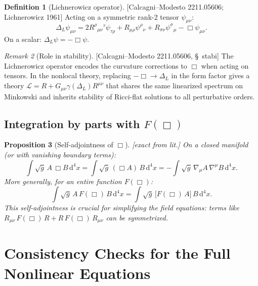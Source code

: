 \documentclass[12pt,a4paper]{article}
\newtheorem{proposition}{Proposition}[section]
\theoremstyle{definition}
\newtheorem{definition}[proposition]{Definition}
\theoremstyle{remark}
\newtheorem{remark}[proposition]{Remark}
\newcommand{\dd}{\mathrm{d}}
\newcommand{\fromlit}[1]{\textcolor{blue!70!black}{\textsf{[#1]}}}
\newcommand{\exactlit}{\textcolor{blue!60!black}{\textsf{[exact from lit.]}}}
\begin{document}
\begin{definition}[Lichnerowicz operator]
\label{def:lichnerowicz}
\fromlit{Calcagni--Modesto 2211.05606; Lichnerowicz 1961}
Acting on a symmetric rank-2 tensor $\psi_{\mu\nu}$:
\begin{equation}\label{eq:lichnerowicz}
  \Delta_L\psi_{\mu\nu}
  = 2R^\rho{}_{\mu\nu}{}^\tau\psi_{\tau\rho}
    + R_{\mu\rho}\psi^\rho{}_\nu
    + R_{\sigma\nu}\psi^\sigma{}_\mu
    - \Box\psi_{\mu\nu}.
\end{equation}
On a scalar: $\Delta_L\psi = -\Box\psi$.
\end{definition}

\begin{remark}[Role in stability]
\fromlit{Calcagni--Modesto 2211.05606, \S~stabi}
The Lichnerowicz operator encodes the curvature corrections to $\Box$
when acting on tensors.  In the nonlocal theory, replacing
$-\Box \to \Delta_L$ in the form factor gives a theory
$\mathcal{L} = R + G_{\mu\nu}\gamma(\Delta_L)R^{\mu\nu}$ that shares
the same linearized spectrum on Minkowski and inherits stability of
Ricci-flat solutions to all perturbative orders.
\end{remark}


\subsection{Integration by parts with $F(\Box)$}

\begin{proposition}[Self-adjointness of $\Box$]
\label{prop:self-adjoint}
\exactlit\;
On a closed manifold (or with vanishing boundary terms):
\begin{equation}\label{eq:box-selfadjoint}
  \int\sqrt{g}\,A\,\Box B\,\dd^4 x
  = \int\sqrt{g}\,(\Box A)\,B\,\dd^4 x
  = -\int\sqrt{g}\,\nabla_\mu A\,\nabla^\mu B\,\dd^4 x.
\end{equation}
More generally, for an entire function $F(\Box)$:
\begin{equation}\label{eq:F-selfadjoint}
  \int\sqrt{g}\,A\,F(\Box)\,B\,\dd^4 x
  = \int\sqrt{g}\,\big[F(\Box)\,A\big]\,B\,\dd^4 x.
\end{equation}
This self-adjointness is crucial for simplifying the field equations:
terms like $R_{\mu\nu}\,F(\Box)\,R + R\,F(\Box)\,R_{\mu\nu}$ can be
symmetrized.
\end{proposition}


\section{Consistency Checks for the Full Nonlinear Equations}
\label{sec:checks}
\end{document}
